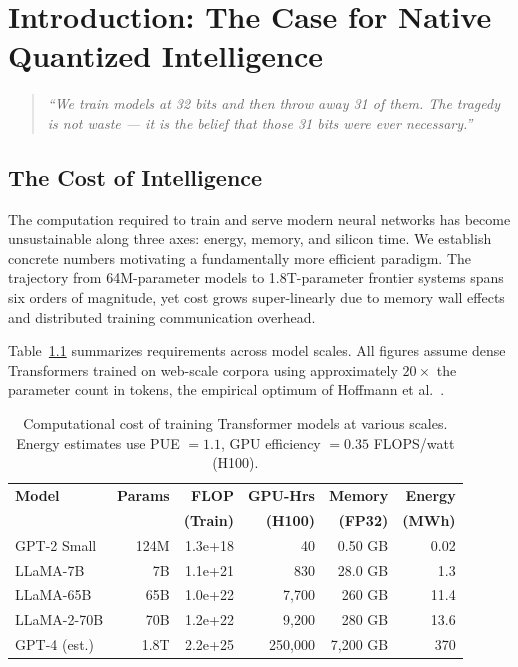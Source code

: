 
\chapter{Introduction: The Case for Native Quantized Intelligence}
\label{ch:introduction}

\begin{quote}
\textit{``We train models at 32 bits and then throw away 31 of them. The tragedy
is not waste --- it is the belief that those 31 bits were ever necessary.''}
\end{quote}

\section{The Cost of Intelligence}
\label{sec:cost_of_intelligence}

The computation required to train and serve modern neural networks has become
unsustainable along three axes: energy, memory, and silicon time. We establish
concrete numbers motivating a fundamentally more efficient paradigm. The
trajectory from 64M-parameter models to 1.8T-parameter frontier systems spans
six orders of magnitude, yet cost grows super-linearly due to memory wall
effects and distributed training communication overhead.

Table~\ref{tab:training_cost} summarizes requirements across model scales.
All figures assume dense Transformers trained on web-scale corpora using
approximately $20\times$ the parameter count in tokens, the empirical
optimum of Hoffmann et al.~\cite{hoffmann2022}.

\begin{table}[htbp]
\centering
\caption{Computational cost of training Transformer models at various scales.
Energy estimates use PUE $= 1.1$, GPU efficiency $= 0.35$ FLOPS/watt (H100).}
\label{tab:training_cost}
\begin{tabular}{lrrrrr}
\toprule
\textbf{Model} & \textbf{Params} & \textbf{FLOP} & \textbf{GPU-Hrs} &
\textbf{Memory} & \textbf{Energy} \\
  & & \textbf{(Train)} & \textbf{(H100)} & \textbf{(FP32)} & \textbf{(MWh)} \\
\midrule
GPT-2 Small      & 124M  & 1.3e+18 & 40        & 0.50 GB    & 0.02  \\
LLaMA-7B         & 7B    & 1.1e+21 & 830       & 28.0 GB    & 1.3   \\
LLaMA-65B        & 65B   & 1.0e+22 & 7{,}700   & 260 GB     & 11.4  \\
LLaMA-2-70B      & 70B   & 1.2e+22 & 9{,}200   & 280 GB     & 13.6  \\
GPT-4 (est.)     & 1.8T  & 2.2e+25 & 250{,}000 & 7{,}200 GB & 370   \\
\bottomrule
\end{tabular}
\end{table}

